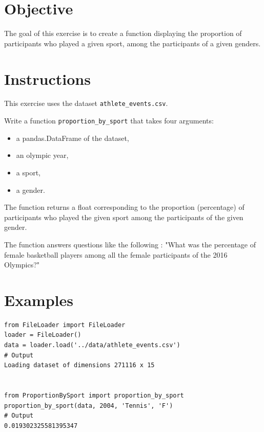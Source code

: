 \documentclass{42-en}
\begin{document}
\section*{Objective}
The goal of this exercise is to create a function displaying
the proportion of participants who played a given sport, among
the participants of a given genders.

\section*{Instructions}
This exercise uses the dataset \texttt{athlete\_events.csv}.

Write a function \texttt{proportion\_by\_sport} that takes four arguments:
\begin{itemize}
  \item a pandas.DataFrame of the dataset,
  \item an olympic year,
  \item a sport,
  \item a gender.
\end{itemize}

The function returns a float corresponding to the proportion (percentage) of participants 
who played the given sport among the participants of the given gender.

The function answers questions like the following : 
"What was the percentage of female basketball players among all the female 
participants of the 2016 Olympics?"



\section*{Examples}
\begin{verbatim}
from FileLoader import FileLoader
loader = FileLoader()
data = loader.load('../data/athlete_events.csv')
# Output
Loading dataset of dimensions 271116 x 15


from ProportionBySport import proportion_by_sport
proportion_by_sport(data, 2004, 'Tennis', 'F')
# Output
0.019302325581395347
\end{verbatim}
\end{document}
